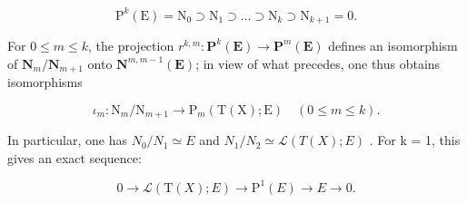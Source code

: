 \[
\mathrm{P} ^ {k} (\mathrm{E}) = \mathrm{N} _ {0} \supset \mathrm{N} _ {1} \supset \dots \supset \mathrm{N} _ {k} \supset \mathrm{N} _ {k + 1} = 0.
\]

For \(0 \leqslant m \leqslant k\), the projection \(r^{k,m}: \mathbf{P}^{k}(\mathbf{E}) \to \mathbf{P}^{m}(\mathbf{E})\) defines an isomorphism of \(\mathbf{N}_{m}/\mathbf{N}_{m+1}\) onto \(\mathbf{N}^{m,m-1}(\mathbf{E})\); in view of what precedes, one thus obtains isomorphisms

\[
\iota_ {m} \colon \mathrm{N} _ {m} / \mathrm{N} _ {m + 1} \rightarrow \mathrm{P} _ {m} (\mathrm{T} (\mathrm{X}); \mathrm{E}) \quad (0 \leqslant m \leqslant k).
\]

In particular, one has \(N_{0}/N_{1} \simeq E\) and \(N_{1}/N_{2} \simeq \mathcal{L}(T(X); E)\) . For k = 1, this gives an exact sequence:

\[
0 \rightarrow \mathscr {L} (\mathrm{T} (X); E) \rightarrow \mathrm{P} ^ {1} (E) \rightarrow E \rightarrow 0.
\]

